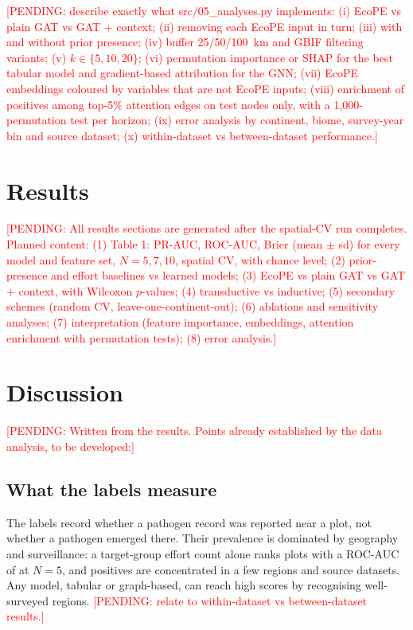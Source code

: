 \documentclass[a4paper,fleqn]{cas-sc}
\newcommand{\pending}[1]{\textcolor{red}{[PENDING: #1]}}
\begin{document}
\pending{describe exactly what src/05\_analyses.py implements: (i) EcoPE vs plain GAT vs GAT + context; (ii) removing each EcoPE input in turn; (iii) with and without prior presence; (iv) buffer 25/50/100~km and GBIF filtering variants; (v) $k \in \{5,10,20\}$; (vi) permutation importance or SHAP for the best tabular model and gradient-based attribution for the GNN; (vii) EcoPE embeddings coloured by variables that are not EcoPE inputs; (viii) enrichment of positives among top-5\% attention edges on test nodes only, with a 1{,}000-permutation test per horizon; (ix) error analysis by continent, biome, survey-year bin and source dataset; (x) within-dataset vs between-dataset performance.}

\section{Results}
\label{sec:results}

\pending{All results sections are generated after the spatial-CV run completes. Planned content:
(1) Table 1: PR-AUC, ROC-AUC, Brier (mean $\pm$ sd) for every model and feature set, $N = 5, 7, 10$, spatial CV, with chance level;
(2) prior-presence and effort baselines vs learned models;
(3) EcoPE vs plain GAT vs GAT + context, with Wilcoxon $p$-values;
(4) transductive vs inductive;
(5) secondary schemes (random CV, leave-one-continent-out);
(6) ablations and sensitivity analyses;
(7) interpretation (feature importance, embeddings, attention enrichment with permutation tests);
(8) error analysis.}

\section{Discussion}
\label{sec:discussion}

\pending{Written from the results. Points already established by the data analysis, to be developed:}

\subsection{What the labels measure}

The labels record whether a pathogen record was reported near a plot, not whether a pathogen emerged there. Their prevalence is dominated by geography and surveillance: a target-group effort count alone ranks plots with a ROC-AUC of \effortOutROCNfive{} at $N=5$, and positives are concentrated in a few regions and source datasets. Any model, tabular or graph-based, can reach high scores by recognising well-surveyed regions. \pending{relate to within-dataset vs between-dataset results.}
\end{document}
